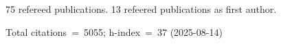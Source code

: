 75 refereed publications. 13 refeered publications as first author.

Total citations~=~5055; h-index~=~37 (2025-08-14)